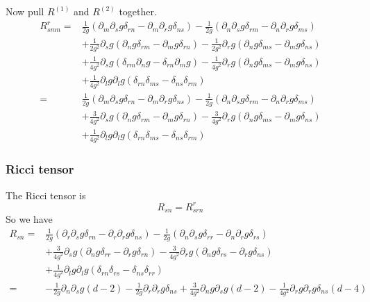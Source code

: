 Now pull $R^{(1)}$ and $R^{(2)}$ together.  
\begin{align}
R^r_{smn}=&\frac{1}{2g}(\partial_m\partial_s g\delta_{rn} - \partial_m\partial_rg\delta _{ns})  -\frac{1}{2g}( \partial_n\partial_sg\delta_{rm} - \partial_n\partial_r g \delta_{ms}) \nonumber\\
&+ \frac{1}{2g^2}\partial_s g (\partial_ng\delta_{rm}-\partial_mg \delta_{rn}) - \frac{1}{2g^2}\partial_rg(\partial_ng\delta_{ms} -\partial_mg\delta _{ns})\nonumber\\
& +\frac{1}{4g^2}\partial_s g(\delta_{rm}\partial_ng -\delta_{rn}\partial_mg) - \frac{1}{4g^2}\partial_r g(\partial_ng\delta_{ms} - \partial_mg\delta_{ns}) \nonumber\\
& + \frac{1}{4g^2}\partial_l g\partial_lg(\delta_{rn}\delta_{ms}- \delta_{ns}\delta_{rm})\\
=&\frac{1}{2g}(\partial_m\partial_s g\delta_{rn} - \partial_m\partial_rg\delta _{ns})  -\frac{1}{2g}( \partial_n\partial_sg\delta_{rm} - \partial_n\partial_r g \delta_{ms}) \nonumber\\
&+ \frac{3}{4g^2}\partial_s g (\partial_ng\delta_{rm}-\partial_mg \delta_{rn}) - \frac{3}{4g^2}\partial_rg(\partial_ng\delta_{ms} -\partial_mg\delta _{ns})\nonumber\\
& + \frac{1}{4g^2}\partial_l g\partial_lg(\delta_{rn}\delta_{ms}- \delta_{ns}\delta_{rm})
\end{align}

\subsubsection{Ricci tensor}

The Ricci tensor is 
\begin{equation}
R_{sn} = R^r_{srn}
\end{equation}
So we have
\begin{align}
R_{sn}=&\frac{1}{2g}(\partial_r\partial_s g\delta_{rn} - \partial_r\partial_rg\delta _{ns})  -\frac{1}{2g}( \partial_n\partial_sg\delta_{rr} - \partial_n\partial_r g \delta_{rs}) \nonumber\\
&+ \frac{3}{4g^2}\partial_s g (\partial_ng\delta_{rr}-\partial_rg \delta_{rn}) - \frac{3}{4g^2}\partial_rg(\partial_ng\delta_{rs} -\partial_rg\delta _{ns})\nonumber\\
& + \frac{1}{4g^2}\partial_l g\partial_lg(\delta_{rn}\delta_{rs}- \delta_{ns}\delta_{rr})\\
=&-\frac{1}{2g}\partial_n\partial_s g(d-2) - \frac{1}{2g}\partial_r\partial_rg\delta _{ns}  + \frac{3}{4g^2}\partial_n g \partial_s g ( d-2 )  - \frac{1}{4g^2}\partial_r g\partial_rg\delta_{ns}(d-4)
\end{align}
